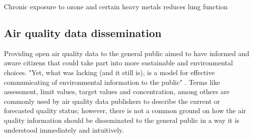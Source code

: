 Chronic exposure to ozone and certain heavy metals reduces lung function \cite{Kampa2008}

\subsection{Air quality data dissemination}
Providing open air quality data to the general public aimed to have informed and aware citizens that could take part into more sustainable and environmental choices. "Yet, what was lacking (and it still is), is a model for effective communicating of environmental information to the public" \cite{Thinh2007}. Terms like assessment, limit values, target values and concentration, among others are commonly used by air quality data publishers to describe the current or forecasted quality status; however, there is not a common ground on how the air quality information should be disseminated to the general public in a way it is understood immediately and intuitively. 

